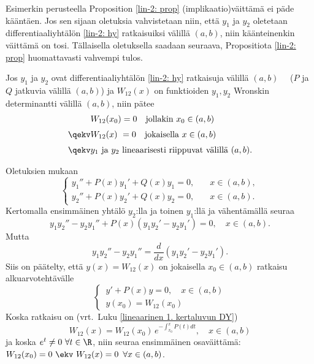 Esimerkin perusteella Proposition \ref{lin-2: prop} (implikaatio)väittämä ei päde kääntäen. Jos
sen sijaan oletuksia vahvistetaan niin, että $y_1$ ja $y_2$ oletetaan differentiaaliyhtälön
\eqref{lin-2: hy} ratkaisuiksi välillä $(a,b)$, niin käänteinenkin väittämä on tosi. Tällaisella
oletuksella saadaan seuraava, Propositiota \ref{lin-2: prop} huomattavasti vahvempi tulos.
\begin{Lause} \label{lin-2: lause 3} Jos $y_1$ ja $y_2$ ovat differentiaaliyhtälön 
\eqref{lin-2: hy} ratkaisuja välillä $(a,b)$ \ \ ($P$ ja $Q$ jatkuvia välillä $(a,b)$) ja 
$W_{12}(x)$ on funktioiden $y_1,y_2$ Wronskin determinantti välillä $(a,b)$, niin pätee
\begin{align*}
      &W_{12}(x_0)=0 \quad \text{jollakin}\ x_0\in (a,b) \\[1mm]
\qekv &W_{12}(x)\ =0 \quad \text{jokaisella}\ x\in(a,b) \\[1mm]
\qekv &\text{$y_1$ ja $y_2$ lineaarisesti riippuvat välillä $(a,b)$}.
\end{align*}
\end{Lause}
\tod Oletuksien mukaan
\[
\begin{cases}
y_1''+P(x)y_1'+Q(x)y_1=0,\quad &x\in (a,b), \\
y_2''+P(x)y_2'+Q(x)y_2=0,\quad &x\in (a,b).
\end{cases}
\]
Kertomalla ensimmäinen yhtälö $y_2$:lla ja toinen $y_1$:llä ja vähentämällä seuraa
\[
y_1y_2''-y_2y_1''+P(x)(y_1y_2'-y_2y_1')=0,\quad x\in (a,b).
\]
Mutta
\[
y_1y_2''-y_2y_1''=\frac{d}{dx}(y_1y_2'-y_2y_1').
\]
Siis on päätelty, että $y(x)=W_{12}(x)$ on jokaisella $x_0\in(a,b)$ ratkaisu alkuarvotehtävälle
\begin{equation} \label{Wronskin yhtälö}
\begin{cases}
\,y'+P(x)y=0,\quad x\in (a,b) \\ \,y(x_0)=W_{12}(x_0)
\end{cases}
\end{equation}
Koska ratkaisu on (vrt.\ Luku \ref{lineaarinen 1. kertaluvun DY})
\[
W_{12}(x)=W_{12}(x_0)\,e^{-\int_{x_0}^x P(t)dt},\quad x\in (a,b)
\]
ja koska $e^t \neq 0\ \forall t\in\R$, niin seuraa ensimmäinen osaväittämä: \ 
$W_{12}(x_0)=0\ \ekv\ W_{12}(x)=0\,\ \forall x\in(a,b)$.

